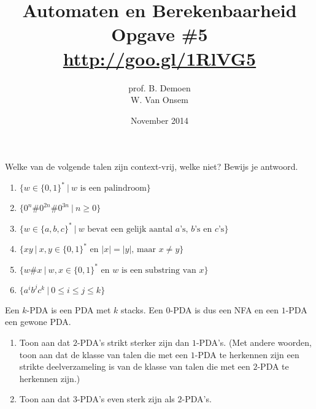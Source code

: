 \documentclass[a4paper]{article}
\title{Automaten en Berekenbaarheid\\Opgave \#5\\\url{http://goo.gl/1RlVG5}}
\author{prof. B. Demoen\\W. Van Onsem}
\date{November 2014}
\begin{document}
\maketitle

\begin{question}
Welke van de volgende talen zijn context-vrij, welke niet? Bewijs je antwoord.
  \begin{enumerate}
		    \item $\{ w \in \{0,1\}^* \ | \ \text{$w$ is een palindroom}\}$
      \item $\{ 0^n\#0^{2n}\#0^{3n} \ | \ n \geq 0 \}$
      \item $\{ w \in \{a,b,c\}^* \ | \ \text{$w$ bevat een gelijk aantal $a$'s, $b$'s en $c$'s} \}$
      \item $\{ xy \ | \ \text{$x,y \in \{0,1\}^*$ en $|x| = |y|$, maar $x \neq y$} \}$
      \item $\{ w \# x \ | \ \text{$w,x \in \{0,1\}^*$ en $w$ is een substring van $x$} \}$
		    \item $\{a^ib^jc^k \ | \ 0 \leq i \leq j \leq k \}$
  \end{enumerate}
\end{question}

\begin{question}
Een $k$-PDA is een PDA met $k$ stacks. Een $0$-PDA is dus een NFA en een $1$-PDA een gewone PDA. 
\begin{enumerate}
  \item Toon aan dat $2$-PDA's strikt sterker zijn dan $1$-PDA's. (Met andere woorden, toon aan dat de klasse van talen die met een $1$-PDA te herkennen zijn een strikte deelverzameling is van de klasse van talen die met een $2$-PDA te herkennen zijn.)
  \item Toon aan dat $3$-PDA's even sterk zijn als $2$-PDA's.
\end{enumerate}
\end{question}
\end{document}
